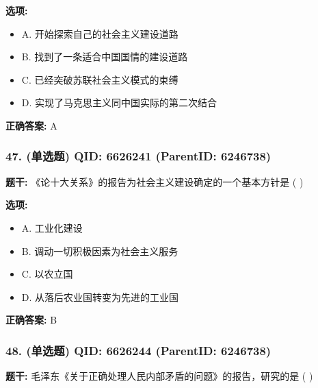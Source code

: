 \documentclass[12pt,UTF8]{ctexart}
\begin{document}
\textbf{选项:}
\begin{itemize}[leftmargin=*]

  \item A. 开始探索自己的社会主义建设道路

  \item B. 找到了一条适合中国国情的建设道路

  \item C. 已经突破苏联社会主义模式的束缚

  \item D. 实现了马克思主义同中国实际的第二次结合

\end{itemize}

\textbf{正确答案:}
A

\vspace{0.3em}\hrulefill\vspace{0.7em}

\subsubsection*{47. (单选题) \small QID: 6626241 (ParentID: 6246738)}

\textbf{题干:}
《论十大关系》的报告为社会主义建设确定的一个基本方针是  ( )



\textbf{选项:}
\begin{itemize}[leftmargin=*]

  \item A. 工业化建设

  \item B. 调动一切积极因素为社会主义服务

  \item C. 以农立国

  \item D. 从落后农业国转变为先进的工业国

\end{itemize}

\textbf{正确答案:}
B

\vspace{0.3em}\hrulefill\vspace{0.7em}

\subsubsection*{48. (单选题) \small QID: 6626244 (ParentID: 6246738)}

\textbf{题干:}
毛泽东《关于正确处理人民内部矛盾的问题》的报告，研究的是  ( )
\end{document}
